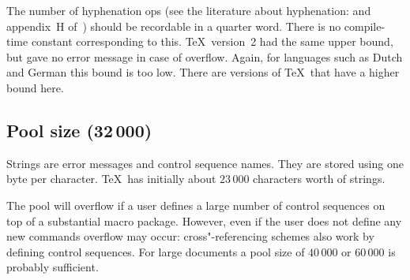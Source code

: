 \documentclass[twoside,letterpaper,openright]{rapport3}
\begin{document}
The number of hyphenation ops (see the literature about
hyphenation: \cite{Liang} and appendix~H of~\cite{Knuth:TeXbook})
should be recordable 
in a quarter word. There is no compile-time constant corresponding
to this. \TeX\ version~2 had the same upper bound, but gave no
error message in case of overflow. Again, for languages such
as Dutch and German this bound is too low.
There are versions of \TeX\ that have a higher bound here.

\subsection{Pool size (32$\,$000)}

Strings are error messages and control sequence names.
They are stored using one byte per character.
\TeX\ has initially about $23\,000$ characters worth of
strings.

The pool will overflow if a user defines a large number of
control sequences on top of a substantial macro package.
However, even if the user does not define any new commands
\mdqon
overflow may occur: cross"-referencing schemes also
\mdqoff
work by defining control sequences. For large documents
a pool size of $40\,000$ or $60\,000$ is probably sufficient.

\end{document}
